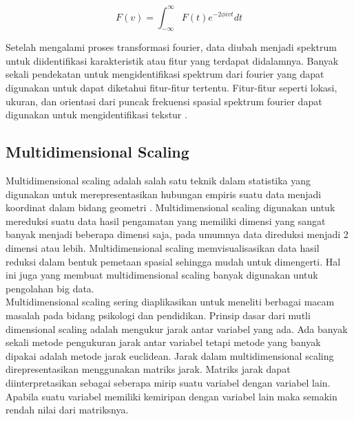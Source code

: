 	\begin{equation}
		F(v)=\int_{-\infty}^{\infty}F(t)e^{-2\phi ivt} dt
	\end{equation}

	
	\indent Setelah mengalami proses transformasi fourier, data diubah menjadi spektrum untuk diidentifikasi karakteristik atau fitur yang terdapat didalamnya. Banyak sekali pendekatan untuk mengidentifikasi spektrum dari fourier yang dapat digunakan untuk dapat diketahui fitur-fitur tertentu. Fitur-fitur seperti lokasi, ukuran, dan orientasi dari puncak frekuensi spasial spektrum fourier dapat digunakan untuk mengidentifikasi tekstur \cite{Liu1990}.
	
	
	\subsection{Multidimensional Scaling}
	\indent Multidimensional scaling adalah salah satu teknik dalam statistika yang digunakan untuk merepresentasikan hubungan empiris suatu data menjadi koordinat dalam bidang geometri \cite{Ding2018}⁠. Multidimensional scaling digunakan untuk mereduksi suatu data hasil pengamatan yang memiliki dimensi yang sangat banyak menjadi beberapa dimensi saja, pada umumnya data direduksi menjadi 2 dimensi atau lebih. Multidimensional scaling memvisualisasikan data hasil reduksi dalam bentuk pemetaan spasial sehingga mudah untuk dimengerti. Hal ini juga yang membuat multidimensional scaling banyak digunakan untuk pengolahan big data. \\ 
	\indent Multidimensional scaling sering diaplikasikan untuk meneliti berbagai macam masalah pada bidang psikologi dan pendidikan. Prinsip dasar dari mutli dimensional scaling adalah mengukur jarak antar variabel yang ada. Ada banyak sekali metode pengukuran jarak antar variabel tetapi metode yang banyak dipakai adalah metode jarak euclidean. Jarak dalam multidimensional scaling direpresentasikan menggunakan matriks jarak. Matriks jarak dapat diinterpretasikan sebagai seberapa mirip suatu variabel dengan variabel lain. Apabila suatu variabel memiliki kemiripan dengan variabel lain maka semakin rendah nilai dari matriksnya.\\   
      
